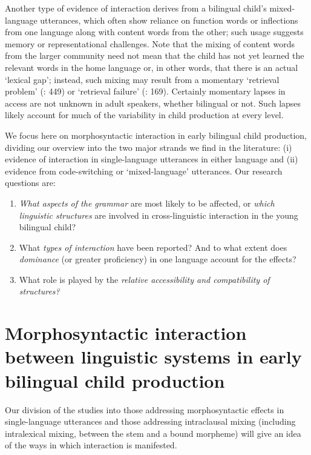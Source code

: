 \documentclass[output=paper]{langscibook}
\begin{document}
Another type of evidence of interaction derives from a bilingual child’s mixed-language utterances, which often show reliance on function words or inflections from one language along with content words from the other; such usage suggests memory or representational challenges. Note that the mixing of content words from the larger community need not mean that the child has not yet learned the relevant words in the home language or, in other words, that there is an actual ‘lexical gap’; instead, such mixing may result from a momentary ‘retrieval problem’ (\citealt{Lanvers2001}: 449) or ‘retrieval failure’ (\citealt{Serratrice2005}: 169). Certainly momentary lapses in access are not unknown in adult speakers, whether bilingual or not. Such lapses likely account for much of the variability in child production at every level.

We focus here on morphosyntactic interaction in early bilingual child production, dividing our overview into the two major strands we find in the literature: (i) evidence of interaction in single-language utterances in either language and (ii) evidence from code-switching or ‘mixed-language’ utterances. Our research questions are: 

\begin{enumerate}
\item \textit{What aspects of the grammar} are most likely to be affected, or \textit{which linguistic structures} are involved in cross-linguistic interaction in the young bilingual child?
\item What \textit{types of interaction} have been reported? And to what extent does \textit{dominance} (or greater proficiency) in one language account for the effects?
\item What role is played by the \textit{relative accessibility and compatibility of structures?}
\end{enumerate}

\section{Morphosyntactic interaction between linguistic systems in early bilingual child production} 

Our division of the studies into those addressing morphosyntactic effects in single-language utterances and those addressing intraclausal mixing (including intralexical mixing, between the stem and a bound morpheme) will give an idea of the ways in which interaction is manifested.
\end{document}
